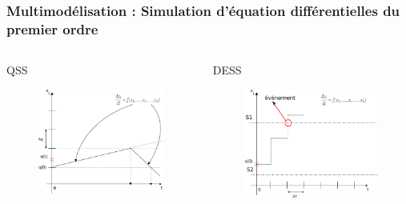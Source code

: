 \documentclass[xetex, compress, table, svgnames]{beamer}
\begin{document}
\begin{frame}
  \frametitle{Multimodélisation : Simulation d'équation
    différentielles du premier ordre}
  \begin{columns}
    \begin{column}{0.48\textwidth}
      \begin{block}{QSS}
        \begin{figure}[h]
          \begin{center}
            \includegraphics[width=\textwidth]{qss2}
          \end{center}
        \end{figure}
      \end{block}
    \end{column}
    \begin{column}{0.48\textwidth}
      \begin{block}{DESS}
        \begin{figure}[h]
          \begin{center}
            \includegraphics[width=\textwidth]{dess2}

\end{center}
\end{figure}
\end{block}
\end{column}
\end{columns}
\end{frame}
\end{document}
